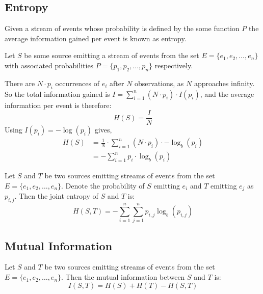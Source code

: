 \subsection{Entropy}
Given a stream of events whose probability is defined by the some function $P$ the average information gained per event is known as entropy.
%
\begin{mydef}
Let $S$ be some source emitting a stream of events from the set $E = \{e_1, e_2, \ldots, e_n\}$ with associated probabilities $P = \{p_1, p_2, \ldots, p_n\}$ respectively.

There are $N\cdot p_i$ occurrences of $e_i$ after $N$ observations, as $N$ approaches infinity.  So the total information gained is $I = \sum_{i = 1}^n (N \cdot p_i) \cdot I(p_i)$, and the average information per event is therefore:
\[ H(S) = \frac{I}{N} \]
Using $I(p_i) = -\log(p_i)$ gives,
\begin{align*}
H(S) &= \frac{1}{N} \cdot \sum_{i = 1}^n  (N \cdot p_i) \cdot -\log_b (p_i)\\
	 &= -\sum_{i = 1}^n  p_i \cdot \log_b (p_i)
\end{align*}  
\end{mydef}


\begin{mydef}
Let $S$ and $T$ be two sources emitting streams of events from the set $E = \{e_1, e_2, \ldots, e_n\}$.  Denote the probability of $S$ emitting $e_i$ and $T$ emitting $e_j$ as $p_{i,j}$.  Then the joint entropy of $S$ and $T$ is:
\[H(S, T) = -\sum_{i = 1}^n\sum_{j = 1}^n p_{i,j} \log_b (p_{i,j})\]
\end{mydef}

\subsection{Mutual Information}
\begin{mydef}
Let $S$ and $T$ be two sources emitting streams of events from the set $E = \{e_1, e_2, \ldots, e_n\}$. Then the mutual information between $S$ and $T$ is:
\[I(S,T) = H(S) + H(T) - H(S,T)\]
\end{mydef}

